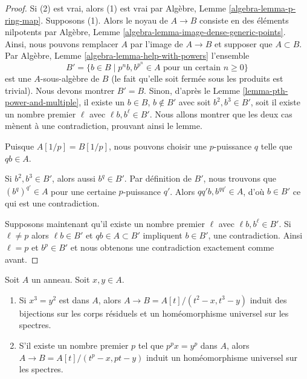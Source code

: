 \begin{proof}
Si (2) est vrai, alors (1) est vrai par Algèbre, Lemme \ref{algebra-lemma-p-ring-map}. Supposons
(1). Alors le noyau de $A \to B$ consiste en des
éléments nilpotents par Algèbre, Lemme \ref{algebra-lemma-image-dense-generic-points}. Ainsi, nous
pouvons remplacer $A$ par l'image de $A \to B$ et
supposer que $A \subset B$. Par Algèbre, Lemme \ref{algebra-lemma-help-with-powers}
l'ensemble
$$
B' = \{b \in B \mid p^nb, b^{p^n} \in A\text{ pour un certain }n \geq 0\}
$$
est une $A$-sous-algèbre de $B$ (le fait qu'elle soit fermée
sous les produits est trivial). Nous
devons montrer $B' = B$. Sinon, d'après le Lemme
\ref{lemma-pth-power-and-multiple}, il existe un $b \in B$, $b \not \in B'$ avec soit
$b^2, b^3 \in B'$, soit il existe un nombre premier $\ell$
avec $\ell b, b^\ell \in B'$. Nous allons
montrer que les deux cas mènent à une contradiction, prouvant ainsi le lemme.

\medskip\noindent Puisque
$A[1/p] = B[1/p]$, nous pouvons choisir une $p$-puissance $q$ telle que $qb \in A$.

\medskip\noindent Si
$b^2, b^3 \in B'$, alors aussi $b^q \in B'$. Par définition de $B'$, nous
trouvons que $(b^q)^{q'} \in A$ pour une certaine $p$-puissance
$q'$. Alors $qq'b, b^{qq'} \in A$, d'où $b \in B'$ ce qui est une contradiction.

\medskip\noindent
Supposons maintenant qu'il existe un nombre premier $\ell$ avec $\ell b, b^\ell \in B'$.
Si $\ell \not = p$ alors $\ell b \in B'$ et $qb \in A \subset B'$ impliquent $b \in B'$, une
contradiction. Ainsi $\ell = p$ et $b^p \in B'$ et nous obtenons
une contradiction exactement comme avant.
\end{proof}

\begin{lemma}
\label{lemma-make-universal-homeo}
Soit $A$ un anneau. Soit $x, y \in A$.
\begin{enumerate}
\item Si $x^3 = y^2$ est dans $A$, alors $A \to B = A[t]/(t^2 - x, t^3 - y)$ induit des bijections
sur les corps résiduels et un homéomorphisme
universel sur les spectres.
\item S'il existe un nombre premier $p$ tel que $p^px = y^p$ dans $A$,
alors $A \to B = A[t]/(t^p - x, pt - y)$ induit un homéomorphisme universel
sur les spectres.
\end{enumerate}
\end{lemma}

